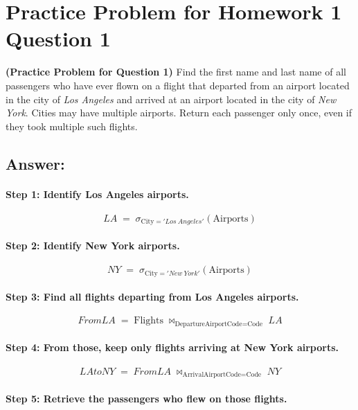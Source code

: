 \documentclass[11pt]{article}
\begin{document}
\vspace*{-0.7in}

\section*{Practice Problem for Homework 1 Question 1}

\textbf{(Practice Problem for Question 1)}  
Find the first name and last name of all passengers who have ever flown on a flight that departed from an airport located in the city of \emph{Los Angeles} and arrived at an airport located in the city of \emph{New York}.  
Cities may have multiple airports. Return each passenger only once, even if they took multiple such flights.

\subsection*{Answer:}


\paragraph{Step 1: Identify Los Angeles airports.}
\[
LA \;=\; \sigma_{\text{City} = 'Los\ Angeles'}(\text{Airports})
\]

\paragraph{Step 2: Identify New York airports.}
\[
NY \;=\; \sigma_{\text{City} = 'New\ York'}(\text{Airports})
\]

\paragraph{Step 3: Find all flights departing from Los Angeles airports.}
\[
FromLA \;=\; \text{Flights} \;\bowtie_{\text{DepartureAirportCode} = \text{Code}}\; LA
\]

\paragraph{Step 4: From those, keep only flights arriving at New York airports.}
\[
LAtoNY \;=\; FromLA \;\bowtie_{\text{ArrivalAirportCode} = \text{Code}}\; NY
\]

\paragraph{Step 5: Retrieve the passengers who flew on those flights.}
\end{document}
